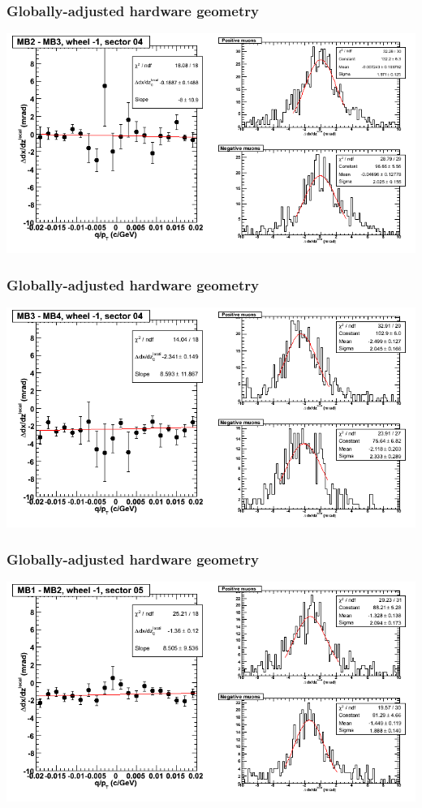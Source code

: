 \documentclass[compress]{beamer}
\begin{document}
\begin{frame}
\frametitle{Globally-adjusted hardware geometry}
\includegraphics[width=\linewidth]{NOV4_segdiffs_HW/dt13_slope_B_04_23.png}
\end{frame}

\begin{frame}
\frametitle{Globally-adjusted hardware geometry}
\includegraphics[width=\linewidth]{NOV4_segdiffs_HW/dt13_slope_B_04_34.png}
\end{frame}

\begin{frame}
\frametitle{Globally-adjusted hardware geometry}
\includegraphics[width=\linewidth]{NOV4_segdiffs_HW/dt13_slope_B_05_12.png}
\end{frame}
\end{document}
